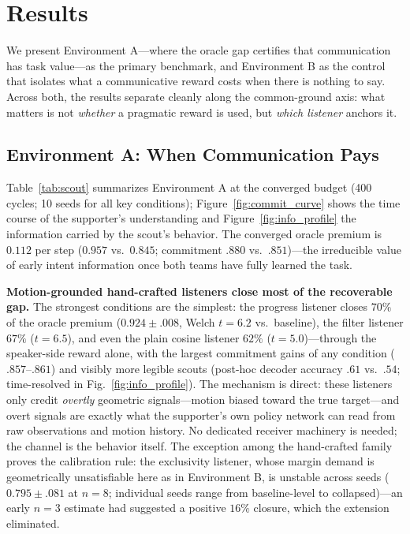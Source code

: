\documentclass{article}
\begin{document}
\section{Results}
\label{sec:results}

We present Environment A---where the oracle gap certifies that communication has task value---as the primary benchmark, and Environment B as the control that isolates what a communicative reward costs when there is nothing to say. Across both, the results separate cleanly along the common-ground axis: what matters is not \emph{whether} a pragmatic reward is used, but \emph{which listener} anchors it.

\subsection{Environment A: When Communication Pays}
\label{ssec:results_scout}

Table~\ref{tab:scout} summarizes Environment A at the converged budget (400 cycles; 10 seeds for all key conditions); Figure~\ref{fig:commit_curve} shows the time course of the supporter's understanding and Figure~\ref{fig:info_profile} the information carried by the scout's behavior. The converged oracle premium is $0.112$ per step ($0.957$ vs.\ $0.845$; commitment $.880$ vs.\ $.851$)---the irreducible value of early intent information once both teams have fully learned the task.

\textbf{Motion-grounded hand-crafted listeners close most of the recoverable gap.} The strongest conditions are the simplest: the progress listener closes $70\%$ of the oracle premium ($0.924\pm.008$, Welch $t=6.2$ vs.\ baseline), the filter listener $67\%$ ($t=6.5$), and even the plain cosine listener $62\%$ ($t=5.0$)---through the speaker-side reward alone, with the largest commitment gains of any condition ($.857$--$.861$) and visibly more legible scouts (post-hoc decoder accuracy $.61$ vs.\ $.54$; time-resolved in Fig.~\ref{fig:info_profile}). The mechanism is direct: these listeners only credit \emph{overtly} geometric signals---motion biased toward the true target---and overt signals are exactly what the supporter's own policy network can read from raw observations and motion history. No dedicated receiver machinery is needed; the channel is the behavior itself. The exception among the hand-crafted family proves the calibration rule: the exclusivity listener, whose margin demand is geometrically unsatisfiable here as in Environment B, is unstable across seeds ($0.795\pm.081$ at $n{=}8$; individual seeds range from baseline-level to collapsed)---an early $n{=}3$ estimate had suggested a positive $16\%$ closure, which the extension eliminated.
\end{document}

